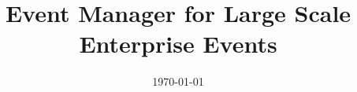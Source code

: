 \documentclass[a4paper, 11pt, oneside]{Thesis}  %
\begin{document}
\frontmatter      %

\title  {Event Manager for Large Scale Enterprise Events}
            
\addresses  {\groupname\\\deptname\\\univname}  %
\date       {\today}
\subject    {}
\keywords   {}

\maketitle


\fancyhead{}  %
\rhead{\thepage}  %
\lhead{}  %

\pagestyle{fancy}  %
\end{document}
